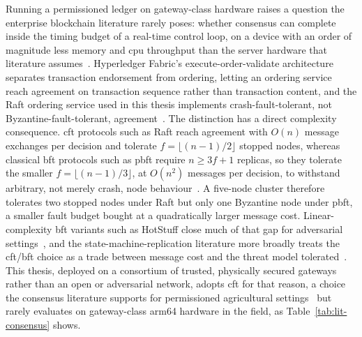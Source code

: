 \documentclass[12pt,a4paper,oneside]{book}
\begin{document}
Running a permissioned ledger on gateway-class hardware raises a question
the enterprise blockchain literature rarely poses: whether consensus can
complete inside the timing budget of a real-time control loop, on a device
with an order of magnitude less memory and \gls{cpu} throughput than the
server hardware that literature assumes~\cite{tar2023fabric,
jayaram2023hyperledger, ibmFabric}. Hyperledger Fabric's execute-order-validate
architecture separates transaction endorsement from ordering, letting an
ordering service reach agreement on transaction sequence rather than
transaction content, and the Raft ordering service used in this thesis
implements crash-fault-tolerant, not Byzantine-fault-tolerant,
agreement~\cite{ongaro2014raft, orderingServiceDoc}. The distinction has a
direct complexity consequence. \gls{cft} protocols such as Raft reach
agreement with $O(n)$ message exchanges per decision and tolerate
$f = \lfloor (n-1)/2 \rfloor$ stopped nodes, whereas classical
\gls{bft} protocols such as \gls{pbft} require $n \geq 3f+1$ replicas,
so they tolerate the smaller
$f = \lfloor (n-1)/3 \rfloor$, at $O(n^2)$ messages per decision, to
withstand arbitrary, not merely crash, node
behaviour~\cite{castro1999practical, ongaro2014raft}. A five-node
cluster therefore tolerates two stopped nodes under Raft but only one
Byzantine node under \gls{pbft}, a smaller fault budget bought at a
quadratically larger message cost. Linear-complexity \gls{bft} variants
such as HotStuff
close much of that gap for adversarial settings~\cite{yin2019hotstuff}, and
the state-machine-replication literature more broadly treats the
\gls{cft}/\gls{bft} choice as a trade between message cost and the
threat model tolerated~\cite{bessani2014state}. This thesis, deployed on a
consortium of trusted, physically secured gateways rather than an open or
adversarial network, adopts \gls{cft} for that reason, a choice the
consensus literature supports for permissioned agricultural
settings~\cite{dube2024fabricIrrigation} but rarely evaluates on
gateway-class \gls{arm64} hardware in the field, as
Table~\ref{tab:lit-consensus} shows.
\end{document}

